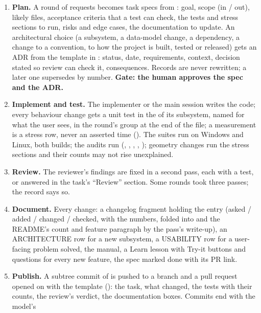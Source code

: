 \begin{enumerate}
  \item \textbf{Plan.} A round of requests becomes task specs  from :
    goal, scope (in / out), likely files, acceptance criteria that a test can check, the tests and stress sections to
    run, risks and edge cases, the documentation to update. An architectural choice (a subsystem, a data-model change, a
    dependency, a change to a convention, to how the project is built, tested or released) gets an ADR from the
    template in : status, date, requirements, context, decision stated so review can
    check it, consequences. Records are never rewritten; a later one supersedes by number. \textbf{Gate: the human
    approves the spec and the ADR.}
  \item \textbf{Implement and test.} The implementer or the main session writes the code; every behaviour change gets a
    unit test in the  of its subsystem, named for what the user sees, in the round's group
    at the end of the file; a measurement is a stress row, never an asserted time (). The suites run on
    Windows and Linux, both builds; the audits run (, , , , ); geometry changes
    run the stress sections and their counts may not rise unexplained.
  \item \textbf{Review.} The reviewer's findings are fixed in a second pass, each with a test, or answered in the task's
    ``Review'' section. Some rounds took three passes; the record says so.
  \item \textbf{Document.} Every change: a changelog fragment holding the entry (asked / added / changed / checked, with the numbers, folded into
     and the README's count and feature paragraph by the pass's write-up), an ARCHITECTURE row for a new subsystem, a USABILITY row for a user-facing
    problem solved, the manual, a Learn lesson with Try-it buttons and questions for every new feature, the spec marked
    done with its PR link.
  \item \textbf{Publish.} A subtree commit of  is pushed to a branch  and a pull
    request opened on  with the template (): the task, what changed,
    the tests with their counts, the review's verdict, the documentation boxes. Commits end with the model's

\end{enumerate}
